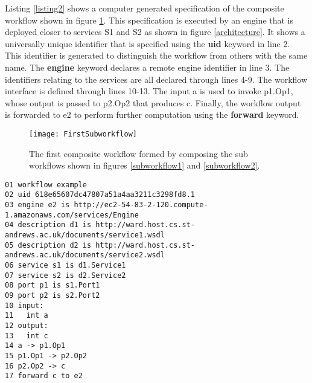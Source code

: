 \documentclass[10pt, conference, compsocconf]{IEEEtran}
\newenvironment{ppl}{\small\ttfamily}{}
\begin{document}
Listing \ref{listing2} shows a computer generated specification of the composite workflow shown in figure \ref{first}.
This specification is executed by an engine that is deployed closer to services \begin{ppl}S1\end{ppl} and \begin{ppl}S2\end{ppl} as shown in figure \ref{architecture}.
It shows a universally unique identifier that is specified using the \begin{ppl}\textbf{uid}\end{ppl} keyword in line 2.
This identifier is generated to distinguish the workflow from others with the same name.
The \begin{ppl}\textbf{engine}\end{ppl} keyword declares a remote engine identifier in line 3.
The identifiers relating to the services are all declared through lines 4-9.
The workflow interface is defined through lines 10-13.
The input \begin{ppl}a\end{ppl} is used to invoke \begin{ppl}p1.Op1\end{ppl}, whose output is passed to \begin{ppl}p2.Op2\end{ppl} that produces \begin{ppl}c\end{ppl}.
Finally, the workflow output is forwarded to \begin{ppl}e2\end{ppl} to perform further computation using the \begin{ppl}\textbf{forward}\end{ppl} keyword.

\begin{figure}[h]
\centerline{\texttt{[image: FirstSubworkflow]}}
\caption{The first composite workflow formed by composing the sub workflows shown in figures \ref{subworkflow1} and \ref{subworkflow2}.}
\label{first}
\end{figure}

\begin{lstlisting}[keywords={workflow, forward, uid, sid, engine, description, service, port, engine, is, input, output, int, any, transmit, to}, caption={Specification of the first composite workflow shown in figure \ref{first}.}, label={listing2}, frame=single]
01 workflow example
02 uid 618e65607dc47807a51a4aa3211c3298fd8.1
03 engine e2 is http://ec2-54-83-2-120.compute-1.amazonaws.com/services/Engine
04 description d1 is http://ward.host.cs.st-andrews.ac.uk/documents/service1.wsdl
05 description d2 is http://ward.host.cs.st-andrews.ac.uk/documents/service2.wsdl
06 service s1 is d1.Service1
07 service s2 is d2.Service2
08 port p1 is s1.Port1
09 port p2 is s2.Port2
10 input: 
11   int a
12 output:
13   int c
14 a -> p1.Op1
15 p1.Op1 -> p2.Op2
16 p2.Op2 -> c
17 forward c to e2
\end{lstlisting}
\end{document}
